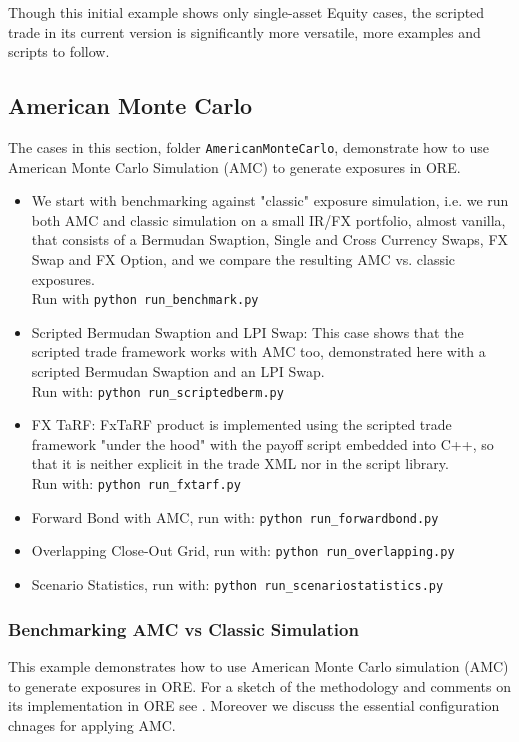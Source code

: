 Though this initial example shows only single-asset Equity cases, the scripted trade in its current version is
significantly more versatile, more examples and scripts to follow.

\subsection{American Monte Carlo}\label{example:amc}

The cases in this section, folder {\tt AmericanMonteCarlo},  demonstrate how to use American Monte Carlo Simulation (AMC)
to generate exposures in ORE.
\begin{itemize}
\item We start with benchmarking against "classic" exposure simulation, i.e. 
  we run both AMC and classic simulation on a small IR/FX portfolio, almost vanilla, that
  consists of a Bermudan Swaption, Single and Cross Currency Swaps, FX Swap and FX Option,
  and we compare the resulting AMC vs. classic exposures. \\
  Run with {\tt python run\_benchmark.py}
\item Scripted Bermudan Swaption and LPI Swap: This case shows that the scripted trade
  framework works with AMC too, demonstrated here with a scripted Bermudan Swaption and an LPI Swap. \\
  Run with: {\tt python run\_scriptedberm.py}
\item FX TaRF: FxTaRF product is implemented using the scripted trade framework "under the hood"
  with the payoff script embedded into C++, so that it is neither explicit in the trade XML nor
  in the script library.\\
  Run with: {\tt python run\_fxtarf.py}
\item Forward Bond with AMC, run with: {\tt python run\_forwardbond.py}
\item Overlapping Close-Out Grid, run with: {\tt python run\_overlapping.py}
\item Scenario Statistics, run with: {\tt python run\_scenariostatistics.py}
\end{itemize}

\subsubsection{Benchmarking AMC vs Classic Simulation}

This example demonstrates how to use American Monte Carlo simulation (AMC) to generate exposures in ORE.
For a sketch of the methodology and comments on its implementation in ORE see \cite{methods}.
Moreover we discuss the essential configuration chnages for applying AMC.

